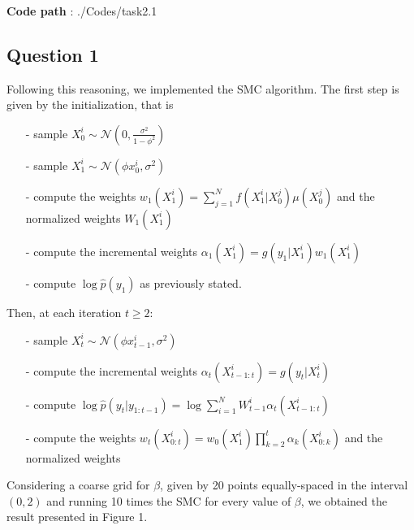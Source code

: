 \documentclass[]{article}
\begin{document}
	\textbf{Code path} : ./Codes/task2.1  
	
	\subsection*{Question 1}
	Following this reasoning, we implemented the SMC algorithm. The first step is given by the initialization, that is 
	\begin{enumerate}
		\item[-] sample $X_0^i \sim \mathcal{N}(0, \frac{\sigma^2}{1-\phi^2})$
		\item[-] sample $X_1^i \sim \mathcal{N}(\phi x_0^i,\sigma^2) $ 
		\item[-] compute the weights $w_1(X_1^i) = \sum_{j=1}^{N}f(X_1^i|X_0^j)\mu(X_0^j)$ and the normalized weights $W_1(X_1^i)$
		\item[-] compute the incremental weights $ \alpha_1(X_1^i) = g(y_1|X_1^i)w_1(X_1^i) $
		\item[-] compute $\log \hat{p}(y_1)$ as previously stated. 
	\end{enumerate}
	Then, at each iteration $t \geq 2$:
	\begin{enumerate}
		\item[-] sample $X_t^i \sim \mathcal{N}(\phi x_{t-1}^i,\sigma^2) $
		\item[-] compute the incremental weights $ \alpha_t(X_{t-1:t}^i) = g(y_t|X_t^i) $
		\item[-] compute $\log \hat{p}(y_t|y_{1:t-1})=\log\sum_{i=1}^{N}W_{t-1}^i\alpha_t(X_{t-1:t}^i)$
		\item[-] compute the weights $
		w_t(X_{0:t}^i)=w_0(X_1^i)\prod_{k=2}^{t}\alpha_k(X_{0:k}^i)$ and the normalized weights
	\end{enumerate}
	Considering a coarse grid for $\beta$, given by 20 points equally-spaced in the interval $(0,2)$ and running 10 times the SMC for every value of $\beta$, we obtained the result presented in Figure 1. 
\end{document}

